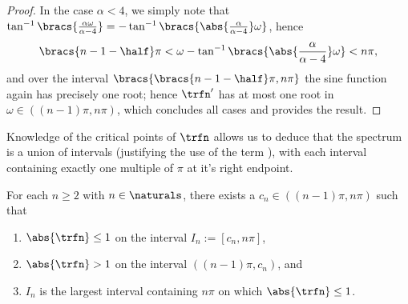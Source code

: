 \begin{proof}
	In the case $\alpha<4$, we simply note that $\tan^{-1}\bracs{\frac{\alpha\omega}{\alpha-4}}=-\tan^{-1}\bracs{\abs{\frac{\alpha}{\alpha-4}}\omega}$, hence
	\begin{align*}
		\bracs{n-1-\half}\pi &< \omega - \tan^{-1}\bracs{\abs{\frac{\alpha}{\alpha-4}}\omega} < n\pi, \\
	\end{align*}
	and over the interval $\bracs{\bracs{n-1-\half}\pi, n\pi}$ the sine function again has precisely one root; hence $\trfn^{\prime}$ has at most one root in $\omega\in((n-1)\pi,n\pi)$, which concludes all cases and provides the result.
\end{proof}

Knowledge of the critical points of $\trfn$ allows us to deduce that the spectrum is a union of intervals (justifying the use of the term ), with each interval containing exactly one multiple of $\pi$ at it's right endpoint. 
\begin{prop} \label{prp:SpecBandsn2}
	For each $n\geq2$ with $n\in\naturals$, there exists a $c_{n}\in((n-1)\pi,n\pi)$ such that 
	\begin{enumerate}
		\item $\abs{\trfn}\leq1$ on the interval $I_{n}:=[c_{n}, n\pi]$, 
		\item $\abs{\trfn}>1$ on the interval $((n-1)\pi, c_{n})$, and
		\item $I_{n}$ is the largest interval containing $n\pi$ on which $\abs{\trfn}\leq1$.
	\end{enumerate}
\end{prop}
